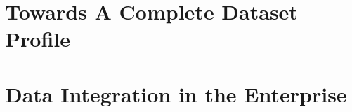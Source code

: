 \documentclass[a4paper,11pt,twoside]{ThesisStyle}
\begin{document}
\part{Towards A Complete Dataset Profile} \label{part:dataset_profiling}






\part{Data Integration in the Enterprise} \label{part:data_integration}









\appendix






\chapter*{}
\chaptermark{}
\vspace{-15ex}
\end{document}

